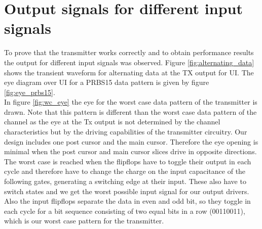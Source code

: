 \section{Output signals for different input signals}

To prove that the transmitter works correctly and to obtain performance results the output for different input signals was observed. Figure \ref{fig:alternating_data} shows the transient waveform for alternating data at the TX output for \unit[6]{UI}. The eye diagram over \unit[10000]{UI} for a PRBS15 data pattern is given by figure \ref{fig:eye_prbs15}.\\
In figure \ref{fig:wc_eye} the eye for the worst case data pattern of the transmitter is drawn. Note that this pattern is different than the worst case data pattern of the channel as the eye at the Tx output is not determined by the channel characteristics but by the driving capabilities of the transmitter circuitry. Our design includes one post cursor and the main cursor. Therefore the eye opening is minimal when the post cursor and main cursor slices drive in opposite directions. The worst case is reached when the flipflops have to toggle their output in each cycle and therefore have to change the charge on the input capacitance of the following gates, generating a switching edge at their input. These also have to switch states and we get the worst possible input signal for our output drivers. Also the input flipflops separate the data in even and odd bit, so they toggle in each cycle for a bit sequence consisting of two equal bits in a row (00110011), which is our worst case pattern for the transmitter.

